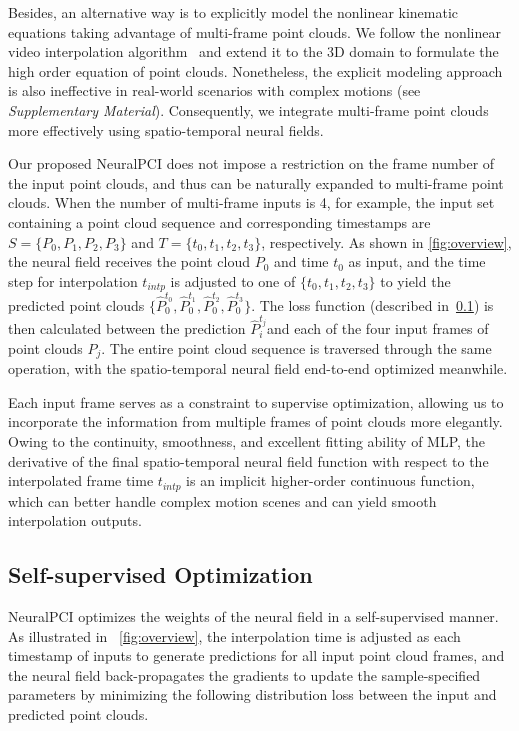 \documentclass[10pt,twocolumn,letterpaper]{article}
\begin{document}
Besides, an alternative way is to explicitly model the nonlinear kinematic equations taking advantage of multi-frame point clouds. We follow the nonlinear video interpolation algorithm~\cite{xu2019quadratic} and extend it to the 3D domain to formulate the high order equation of point clouds. Nonetheless, the explicit modeling approach is also ineffective in real-world scenarios with complex motions (see \textit{Supplementary Material}). Consequently, we integrate multi-frame point clouds more effectively using spatio-temporal neural fields.

Our proposed NeuralPCI does not impose a restriction on the frame number of the input point clouds, and thus can be naturally expanded to multi-frame point clouds. When the number of multi-frame inputs is 4, for example, the input set containing a point cloud sequence and corresponding timestamps are $S=\{P_{0}, P_{1}, P_{2}, P_{3}\}$ and $T=\{t_{0}, t_{1}, t_{2}, t_{3}\}$, respectively. As shown in \cref{fig:overview}, the neural field receives the point cloud $P_{0}$ and time $t_{0}$ as input, and the time step for interpolation $t_{intp}$ is adjusted to one of $\{t_{0}, t_{1}, t_{2}, t_{3}\}$ to yield the predicted point clouds $\{\hat{P}_{0}^{t_{0}}, \hat{P}_{0}^{t_{1}}, \hat{P}_{0}^{t_{2}}, \hat{P}_{0}^{t_{3}} \}$. The loss function (described in~\cref{sec: self-supervised optimization}) is then calculated between the prediction $\hat{P}_{i}^{t_{j}}$and each of the four input frames of point clouds $P_{j}$. The entire point cloud sequence is traversed through the same operation, with the spatio-temporal neural field end-to-end optimized meanwhile.

Each input frame serves as a constraint to supervise optimization, allowing us to incorporate the information from multiple frames of point clouds more elegantly. Owing to the continuity, smoothness, and excellent fitting ability of MLP, the derivative of the final spatio-temporal neural field function with respect to the interpolated frame time $t_{intp}$ is an implicit higher-order continuous function, which can better handle complex motion scenes and can yield smooth interpolation outputs.


  
\subsection{Self-supervised Optimization}  
\label{sec: self-supervised optimization}  
NeuralPCI optimizes the weights of the neural field in a self-supervised manner. As illustrated in ~\cref{fig:overview}, the interpolation time is adjusted as each timestamp of inputs to generate predictions for all input point cloud frames, and the neural field back-propagates the gradients to update the sample-specified parameters by minimizing the following distribution loss between the input and predicted point clouds.
\end{document}

